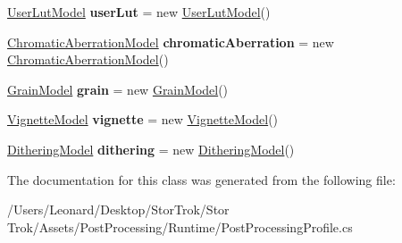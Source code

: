 \begin{DoxyCompactItemize}
\hyperlink{class_unity_engine_1_1_post_processing_1_1_user_lut_model}{User\+Lut\+Model} {\bfseries user\+Lut} = new \hyperlink{class_unity_engine_1_1_post_processing_1_1_user_lut_model}{User\+Lut\+Model}()
\item 
\mbox{\label{class_unity_engine_1_1_post_processing_1_1_post_processing_profile_a142138c77a670d153c04da81fc8dcff5}} 
\hyperlink{class_unity_engine_1_1_post_processing_1_1_chromatic_aberration_model}{Chromatic\+Aberration\+Model} {\bfseries chromatic\+Aberration} = new \hyperlink{class_unity_engine_1_1_post_processing_1_1_chromatic_aberration_model}{Chromatic\+Aberration\+Model}()
\item 
\mbox{\label{class_unity_engine_1_1_post_processing_1_1_post_processing_profile_ab2048238d01e1b60a859755167fae28a}} 
\hyperlink{class_unity_engine_1_1_post_processing_1_1_grain_model}{Grain\+Model} {\bfseries grain} = new \hyperlink{class_unity_engine_1_1_post_processing_1_1_grain_model}{Grain\+Model}()
\item 
\mbox{\label{class_unity_engine_1_1_post_processing_1_1_post_processing_profile_abee3b27a6acda75032c825ce759f2838}} 
\hyperlink{class_unity_engine_1_1_post_processing_1_1_vignette_model}{Vignette\+Model} {\bfseries vignette} = new \hyperlink{class_unity_engine_1_1_post_processing_1_1_vignette_model}{Vignette\+Model}()
\item 
\mbox{\label{class_unity_engine_1_1_post_processing_1_1_post_processing_profile_aa72f3687adc37b27032d21e3649001e3}} 
\hyperlink{class_unity_engine_1_1_post_processing_1_1_dithering_model}{Dithering\+Model} {\bfseries dithering} = new \hyperlink{class_unity_engine_1_1_post_processing_1_1_dithering_model}{Dithering\+Model}()
\end{DoxyCompactItemize}


The documentation for this class was generated from the following file\+:\begin{DoxyCompactItemize}
\item 
/\+Users/\+Leonard/\+Desktop/\+Stor\+Trok/\+Stor Trok/\+Assets/\+Post\+Processing/\+Runtime/Post\+Processing\+Profile.\+cs\end{DoxyCompactItemize}
